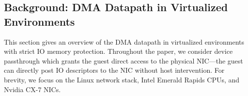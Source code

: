 \subsection{Background: DMA Datapath in Virtualized Environments}
\label{vfree:sec:background-datapath}
This section gives an overview of the DMA datapath 
    in virtualized environments with strict IO memory protection.
%
%
Throughout the paper, we consider device passthrough which grants the guest direct access 
    to the physical NIC---the guest can directly post IO descriptors to the NIC without host intervention. 
For brevity, we focus on the Linux network stack, Intel Emerald Rapids CPUs, and Nvidia CX-7 NICs. 


